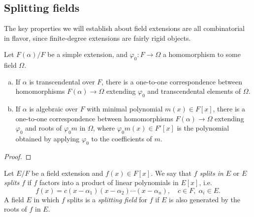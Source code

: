 \documentclass[10pt]{article}
\providecommand{\ii}{\item}
\providecommand{\vocab}[1]{{{\sffamily\textit{#1}}}}
\begin{document}
\subsection{Splitting fields}
The key properties we will establish about field extensions
are all combinatorial in flavor, since finite-degree extensions
are fairly rigid objects.

\begin{prop}
    \label{prop:simple-extension-homomorphism-correspondence}
    Let $F(\alpha)/F$ be a simple extension,
    and $\varphi_0\colon F\to \Omega$ a homomorphism
    to some field $\Omega$.
    \begin{enumerate}[(a)]
        \ii If $\alpha$ is transcendental over $F$,
	there is a one-to-one correspondence
	between homomorphisms $F(\alpha)\to\Omega$ extending $\varphi_0$
	and transcendental elements of $\Omega$.
	\ii If $\alpha$ is algebraic over $F$
	with minimal polynomial $m(x)\in F[x]$,
	there is a one-to-one correspondence
	between homomorphisms $F(\alpha)\to\Omega$ extending $\varphi_0$
	and roots of $\varphi_0m$ in $\Omega$,
	where $\varphi_0m(x)\in F'[x]$ is the polynomial obtained
	by applying $\varphi_0$ to the coefficients of $m$.
    \end{enumerate}
\end{prop}

\begin{proof}
\end{proof}

\begin{definition}
    \label{def:splitting-field}
    Let $E/F$ be a field extension and $f(x)\in F[x]$.
    We say that \vocab{$f$ splits in $E$} or
    \vocab{$E$ splits $f$} if $f$ factors into
    a product of linear polynomials in $E[x]$, i.e.
    \begin{equation*}
        f(x) = c(x - \alpha_1)(x - \alpha_2)\cdots(x-\alpha_n),
	\quad c\in F,\; \alpha_i\in E.
    \end{equation*}
    A field $E$ in which $f$ splits is a \vocab{splitting field} for $f$
    if $E$ is also generated by the roots of $f$ in $E$.
\end{definition}
\end{document}
